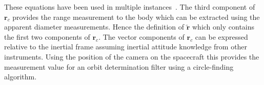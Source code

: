These equations have been used in multiple instances~\cite{Battin, Owen_OpNav}. The third component of $\bm r_c$ provides the range measurement to the body which can be extracted using the apparent diameter measurements. Hence the definition of $\tilde{\bm r}$ which only contains the first two components of $\bm r_c$. The vector components of $\bm r_{c}$ can be expressed relative to the inertial frame assuming inertial attitude knowledge from other instruments. Using the position of the camera on the spacecraft this provides the measurement value for an orbit determination filter using a circle-finding algorithm.  

